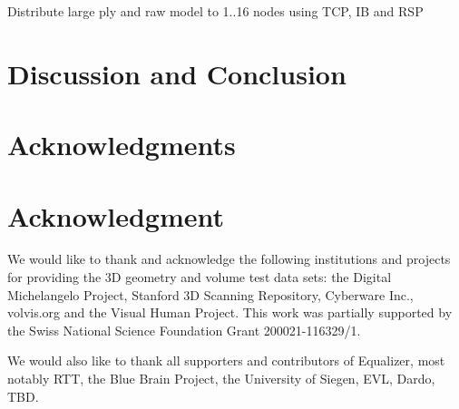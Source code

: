 \documentclass[10pt,journal,compsoc]{IEEEtran}
\begin{document}
Distribute large ply and raw model to 1..16 nodes using TCP, IB and RSP


\section{Discussion and Conclusion}
\label{sec:conclusions}


\appendices
\ifCLASSOPTIONcompsoc
  \section*{Acknowledgments}
\else
  \section*{Acknowledgment}
\fi
We would like to thank and acknowledge the following institutions and projects
for providing the 3D geometry and volume test data sets: the Digital
Michelangelo Project, Stanford 3D Scanning Repository, Cyberware Inc.,
volvis.org and the Visual Human Project.  This work was partially supported by
the Swiss National Science Foundation Grant 200021-116329/1.

We would also like to thank all supporters and contributors of Equalizer, most
notably RTT, the Blue Brain Project, the University of Siegen, EVL, Dardo, TBD.


%
\end{document}
